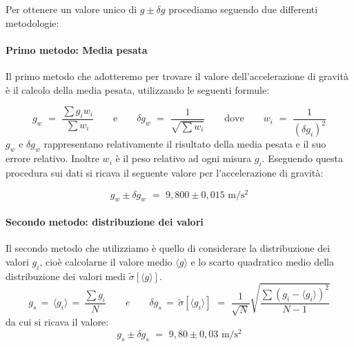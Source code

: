 Per ottenere un valore unico di $g \pm \delta g$ procediamo seguendo due differenti metodologie:

\paragraph{Primo metodo: Media pesata\\}

Il primo metodo che adotteremo per trovare il valore dell'accelerazione di gravità è il calcolo della media pesata, utilizzando le seguenti formule:

\begin{equation*}
g_w \,\, = \,\, \frac{\sum g_iw_i}{\sum w_i} \quad\quad \text{e} \quad\quad \delta g_w \,\, = \,\, \frac{1}{\sqrt{\sum w_i}} \quad\quad \text{dove} \quad\quad w_i \,\, = \,\, \frac{1}{(\delta g_i)^2}
\end{equation*}
%
$g_w$ e $\delta g_w$ rappresentano relativamente il risultato della media pesata e il suo errore relativo. Inoltre $w_i$ è il peso relativo ad ogni misura $g_i$.
Eseguendo questa procedura sui dati si ricava il seguente valore per l'accelerazione di gravità:

\begin{equation}
g_w \pm \delta g_w \,\, = \,\, 9,800 \pm 0,015 \,\, \si{\metre\per\square\second}
\end{equation}

\paragraph{Secondo metodo: distribuzione dei valori\\}

Il secondo metodo che utilizziamo è quello di considerare la distribuzione dei valori $g_i$, cioè calcolarne il valore medio $\langle g\rangle$ e lo scarto quadratico medio della distribuzione dei valori medi $\tilde{\sigma}[\langle g \rangle]$.
\begin{equation}
g_s \, = \, \langle g_i \rangle \, = \, \frac{\sum g_i}{N} \quad\quad e \quad\quad	\delta g_s \, = \, \tilde{\sigma}[\langle g_i \rangle] \,\, = \,\, \frac{1}{\sqrt{N}}\sqrt{\frac{\sum (g_i - \langle g_i \rangle)^2}{N-1}}
\end{equation}
%
da cui si ricava il valore:
\begin{equation}
g_s \pm \delta g_s \,\, = \,\, 9,80 \pm 0,03 \,\, \si{\metre\per\square\second}
\end{equation}

